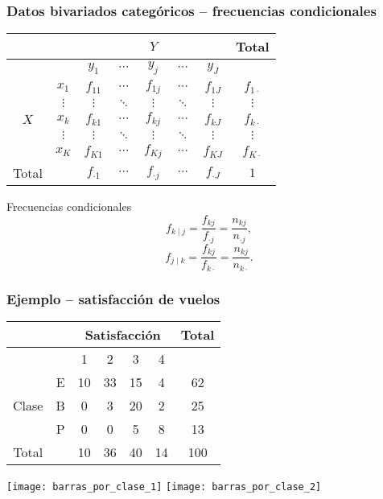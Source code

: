 \documentclass[table]{beamer}
\begin{document}
\begin{frame}
    \frametitle{Datos bivariados categóricos -- frecuencias condicionales}
    \begin{center}
        \begin{tabular}{c|c|ccccc|c}
            & & \multicolumn{5}{c|}{$Y$} & Total \\
            \hline
            & & $y_{1}$ & $\cdots$ & $y_{j}$ & $\cdots$ & $y_{J}$ & \\
            \hline
            & $x_{1}$ & $f_{11}$ & $\cdots$ & $f_{1j}$ & $\cdots$ & $f_{1J}$ & $f_{1 \cdot}$ \\
             & $\vdots$ & $\vdots$ & $\ddots$ & $\vdots$ & $\ddots$ & $\vdots$ & $\vdots$ \\
            $X$ & $x_{k}$ & $f_{k1}$ & $\cdots$ & $f_{kj}$ & $\cdots$ & $f_{kJ}$ & $f_{k \cdot}$ \\
             & $\vdots$ & $\vdots$ & $\ddots$ & $\vdots$ & $\ddots$ & $\vdots$ & $\vdots$ \\
            & $x_{K}$ & $f_{K1}$ & $\cdots$ & $f_{Kj}$ & $\cdots$ & $f_{KJ}$ & $f_{K \cdot}$ \\
            \hline
            Total & & $f_{\cdot 1}$ & $\cdots$ & $f_{\cdot j}$ & $\cdots$ & $f_{\cdot J}$ & $1$ \\
        \end{tabular}
    \end{center}
    \begin{block}{Frecuencias condicionales}
            \begin{equation*}
                f_{k \mid j} = \frac{f_{k j}}{f_{\cdot j}} = \frac{n_{k j}}{n_{\cdot j}} ,
            \end{equation*}
            \begin{equation*}
                f_{j \mid k} = \frac{f_{k j}}{f_{k \cdot}} = \frac{n_{k j}}{n_{k \cdot}} .
            \end{equation*}
    \end{block}
\end{frame}

\begin{frame}
    \frametitle{Ejemplo -- satisfacción de vuelos}
    \begin{center}
        \begin{tabular}{c|c|cccc|c}
            & & \multicolumn{4}{c|}{Satisfacción} & Total \\
            \hline
            & & 1 & 2 & 3 & 4 & \\
            \hline
            & E & 10 & 33 & 15 & 4 & 62 \\
            Clase & B & 0 & 3 & 20 & 2 & 25 \\
            & P & 0 & 0 & 5 & 8 & 13 \\
            \hline
            Total & & 10 & 36 & 40 & 14 & 100
        \end{tabular}
        \texttt{[image: barras\_por\_clase\_1]}
        \texttt{[image: barras\_por\_clase\_2]}
    \end{center}
\end{frame}
\end{document}
